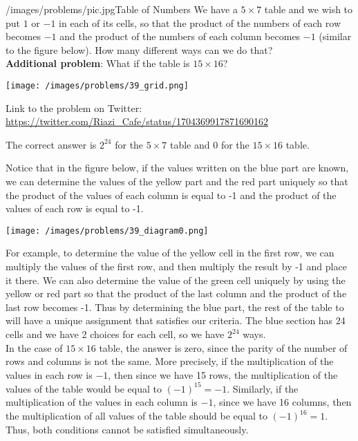 \begin{problem}{/images/problems/pic.jpg}{Table of Numbers}
	We have a $5 \times 7$ table and we wish to put $1$ or $-1$ in each of its cells, so that the product of the numbers of each row becomes $-1$ and the product of the numbers of each column becomes $-1$ (similar to the figure below). How many different ways can we do that?\\[0.2cm]

\textbf{Additional problem}: What if the table is $15 \times 16$?

\begin{center}
	\texttt{[image: /images/problems/39\_grid.png]}
\end{center}

Link to the problem on Twitter:  \url{https://twitter.com/Riazi_Cafe/status/1704369917871690162}
\end{problem}
\begin{solution}
The correct answer is $2^{24}$ for the $5 \times 7$ table and 0 for the $15 \times 16$ table.

Notice that in the figure below, if the values written on the blue part are known, we can determine the values of the yellow part and the red part uniquely so that the product of the values of each column is equal to -1 and the product of the values of each row is equal to -1.

\begin{center}
	\texttt{[image: /images/problems/39\_diagram0.png]}
\end{center}


For example, to determine the value of the yellow cell in the first row, we can multiply the values of the first row, and then multiply the result by -1 and place it there.
We can also determine the value of the green cell uniquely by using the yellow or red part so that the product of the last column and the product of the last row becomes -1. Thus by determining the blue part, the rest of the table to will have a unique assignment that satisfies our criteria. The blue section has 24 cells and we have 2 choices for each cell, so we have $2^{24}$ ways.\\[0.2cm]



In the case of  $15 \times 16$ table, the answer is zero, since the parity of the number of rows and columns is not the same. More precisely, if the multiplication of the values in each row is $-1$, then since we have 15 rows, the multiplication of the values of the table would be equal to $(-1)^{15} = -1$. Similarly, if the multiplication of the values in each column is $-1$, since we have 16 columns, then the multiplication of all values of the table should be equal to $(-1)^{16} = 1$. Thus, both conditions cannot be satisfied simultaneously.



\end{solution}